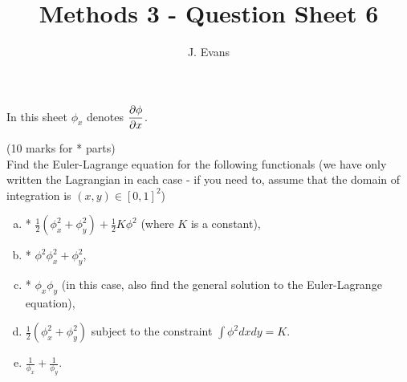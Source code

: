 \documentclass[12pt]{article}
\title{Methods 3 - Question Sheet 6}
\author{J. Evans}
\date{}
\begin{document}
\maketitle

In this sheet $\phi_x$ denotes $\dfrac{\partial \phi}{\partial x}$.

\begin{question}(10 marks for * parts)\\
Find the Euler-Lagrange equation for the following functionals (we have only written the Lagrangian in each case - if you need to, assume that the domain of integration is $(x,y)\in[0,1]^2$)
\begin{enumerate}[(a)]
\item * $\frac{1}{2}\left(\phi_x^2+\phi_y^2\right)+\frac{1}{2}K\phi^2$ (where $K$ is a constant),
\item * $\phi^2\phi_x^2+\phi_y^2$,
\item * $\phi_x\phi_y$ (in this case, also find the general solution to the Euler-Lagrange equation),
\item $\frac{1}{2}\left(\phi_x^2+\phi_y^2\right)$ subject to the constraint $\int\phi^2 dxdy=K$.
\item $\frac{1}{\phi_x}+\frac{1}{\phi_y}$.
\end{enumerate}
\end{question}
\end{document}
